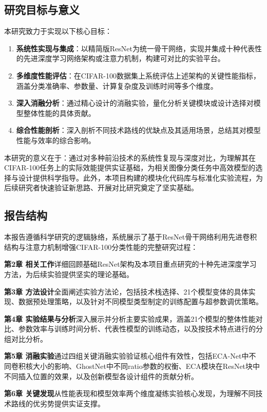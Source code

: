 \documentclass[a4paper]{article}
\begin{document}
\subsection{研究目标与意义}
本研究致力于实现以下核心目标：
\begin{enumerate}
    \item \textbf{系统性实现与集成}：以精简版ResNet为统一骨干网络，实现并集成十种代表性的先进深度学习网络架构或注意力机制，构建可对比的实验平台。
    \item \textbf{多维度性能评估}：在CIFAR-100数据集上系统评估上述架构的关键性能指标，涵盖分类准确率、参数量、计算复杂度及训练时间等多个维度。
    \item \textbf{深入消融分析}：通过精心设计的消融实验，量化分析关键模块或设计选择对模型整体性能的具体贡献。
    \item \textbf{综合性能剖析}：深入剖析不同技术路线的优缺点及其适用场景，总结其对模型性能与效率的综合影响。
\end{enumerate}

本研究的意义在于：通过对多种前沿技术的系统性复现与深度对比，为理解其在CIFAR-100任务上的实际效能提供实证基础，为相关图像分类任务中高效模型的选择与设计提供科学指导。此外，本项目构建的模块化代码库与标准化实验流程，为后续研究者快速验证新思路、开展对比研究奠定了坚实基础。

\subsection{报告结构}
本报告遵循科学研究的逻辑脉络，系统展示了基于ResNet骨干网络利用先进卷积结构与注意力机制增强CIFAR-100分类性能的完整研究过程：

\textbf{第2章 相关工作}详细回顾基础ResNet架构及本项目重点研究的十种先进深度学习方法，为后续实验提供坚实的理论基础。

\textbf{第3章 方法设计}全面阐述实验方法论，包括技术栈选择、21个模型变体的具体实现、数据预处理策略，以及针对不同模型类型制定的训练配置与超参数调优策略。

\textbf{第4章 实验结果与分析}深入展示并分析主要实验成果，涵盖21个模型的整体性能对比、参数效率与训练时间分析、代表性模型的训练动态，以及按技术特点进行的分组对比分析。

\textbf{第5章 消融实验}通过四组关键消融实验验证核心组件有效性，包括ECA-Net中不同卷积核大小的影响、GhostNet中不同ratio参数的权衡、ECA模块在ResNet块中不同插入位置的效果，以及创新模型各设计组件的贡献分析。

\textbf{第6章 关键发现}从性能表现和模型效率两个维度凝练实验核心发现，为理解不同技术路线的优劣势提供实证支撑。
\end{document}
